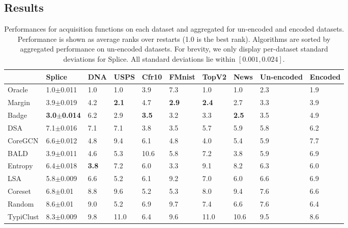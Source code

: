 \documentclass[]{article}
\begin{document}
\subsection{Results}
%
\begin{table}[]
	\caption{Performances for acquisition functions on each dataset and aggregated for un-encoded and encoded datasets. Performance is shown as average ranks over restarts (1.0 is the best rank). Algorithms are sorted by aggregated performance on un-encoded datasets. For brevity, we only display per-dataset standard deviations for Splice. All standard deviations lie within $[0.001, 0.024]$.}
	\label{tab:results}
	\centering
\begin{tabular}{l|lllllll|ll}
          & Splice & DNA  & USPS & Cfr10 & FMnist & TopV2 & News  & Un-encoded & Encoded \\
          \hline
Oracle & 1.0$\pm$0.011 & 1.0 & 1.0 & 3.9 & 7.3 & 1.0 & 1.0 & 2.3 & 1.9 \\
Margin & 3.9$\pm$0.019 & 4.2 & \textbf{2.1} & 4.7 & \textbf{2.9} & \textbf{2.4} & 2.7 & 3.3 & 3.9 \\
Badge & \textbf{3.0$\pm$0.014} & 6.2 & 2.9 & \textbf{3.5} & 3.2 & 3.3 & \textbf{2.5} & 3.5 & 4.9 \\
DSA & 7.1$\pm$0.016 & 7.1 & 7.1 & 3.8 & 3.5 & 5.7 & 5.9 & 5.8 & 6.2 \\
CoreGCN & 6.6$\pm$0.012 & 4.8 & 9.4 & 6.1 & 4.8 & 4.0 & 5.4 & 5.9 & 7.7 \\
BALD & 3.9$\pm$0.011 & 4.6 & 5.3 & 10.6 & 5.8 & 7.2 & 3.8 & 5.9 & 6.9 \\
Entropy & 6.4$\pm$0.018 & \textbf{3.8} & 7.2 & 6.0 & 3.3 & 9.1 & 8.2 & 6.3 & 6.0 \\
LSA & 5.8$\pm$0.009 & 6.6 & 5.2 & 6.1 & 9.2 & 7.0 & 6.0 & 6.6 & 6.9 \\
Coreset & 6.8$\pm$0.01 & 8.8 & 9.6 & 5.2 & 5.3 & 8.0 & 9.4 & 7.6 & 6.6 \\
Random & 8.6$\pm$0.01 & 9.0 & 5.2 & 6.9 & 9.7 & 7.4 & 6.6 & 7.6 & 6.4 \\
TypiClust & 8.3$\pm$0.009 & 9.8 & 11.0 & 6.4 & 9.6 & 11.0 & 10.6 & 9.5 & 8.6
\end{tabular}
\end{table}
\end{document}

